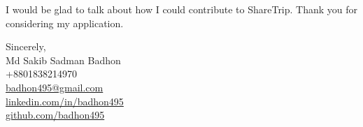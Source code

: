 \documentclass[a4paper]{article}
\begin{document}
\noindent I would be glad to talk about how I could contribute to ShareTrip. Thank you for considering my application.

\vspace{6pt}
\noindent Sincerely, \\
\noindent Md Sakib Sadman Badhon \\
+8801838214970 \\
\href{mailto:badhon495@gmail.com}{badhon495@gmail.com} \\
\href{https://linkedin.com/in/badhon495/}{linkedin.com/in/badhon495} \\
\href{https://github.com/badhon495}{github.com/badhon495}
\end{document}
